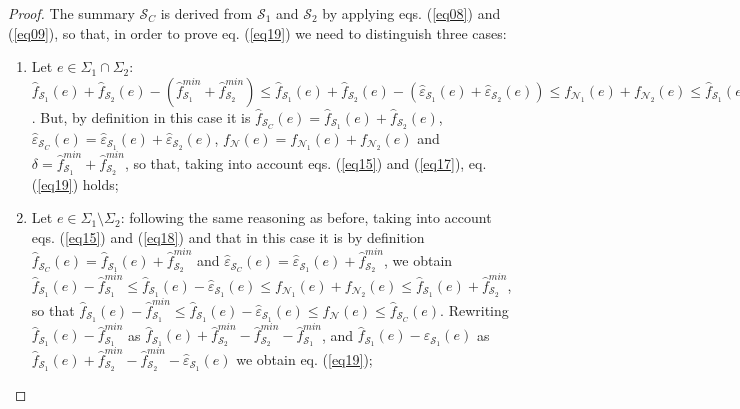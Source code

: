 \documentclass[final,3p,times]{elsarticle}
\begin{document}
\begin{proof}


The summary $\mathcal{S}_C$ is derived from $\mathcal{S}_1$ and $\mathcal{S}_2$ by applying eqs. (\ref{eq08}) and (\ref{eq09}), so that, in order to prove eq. (\ref{eq19}) we need to distinguish three cases:

\begin{enumerate}
  \item Let $e \in \Sigma_1 \cap \Sigma_2$: $\hat{f}_{\mathcal{S}_1}(e) + \hat{f}_{\mathcal{S}_2}(e) - (\hat{f}_{\mathcal{S}_1}^{min} + \hat{f}_{\mathcal{S}_2}^{min}) \leq \hat{f}_{\mathcal{S}_1}(e) + \hat{f}_{\mathcal{S}_2}(e) - (\hat{\varepsilon}_{\mathcal{S}_1}(e) + \hat{\varepsilon}_{\mathcal{S}_2}(e)) \leq f_{\mathcal{N}_1}(e) + f_{\mathcal{N}_2}(e) \leq \hat{f}_{\mathcal{S}_1}(e) + \hat{f}_{\mathcal{S}_2}(e)$. But, by definition in this case it is $\hat{f}_{\mathcal{S}_C}(e) = \hat{f}_{\mathcal{S}_1}(e) + \hat{f}_{\mathcal{S}_2}(e)$, $\hat{\varepsilon}_{\mathcal{S}_C}(e) = \hat{\varepsilon}_{\mathcal{S}_1}(e) + \hat{\varepsilon}_{\mathcal{S}_2}(e)$, 
       $f_{\mathcal{N}}(e) = f_{\mathcal{N}_1}(e) + f_{\mathcal{N}_2}(e)$ and $\delta = \hat{f}_{\mathcal{S}_1}^{min} + \hat{f}_{\mathcal{S}_2}^{min}$, so that, taking into account eqs. (\ref{eq15}) and (\ref{eq17}), eq. (\ref{eq19}) holds;
  
  \item Let $e \in \Sigma_1 \setminus \Sigma_2$: following the same reasoning as before, taking into account eqs. (\ref{eq15}) and (\ref{eq18}) and that in this case it is by definition $\hat{f}_{\mathcal{S}_C}(e) = \hat{f}_{\mathcal{S}_1}(e) + \hat{f}_{\mathcal{S}_2}^{min}$ and $\hat{\varepsilon}_{\mathcal{S}_C}(e) = \hat{\varepsilon}_{\mathcal{S}_1}(e) + \hat{f}_{\mathcal{S}_2}^{min}$, we obtain $\hat{f}_{\mathcal{S}_1}(e) - \hat{f}_{\mathcal{S}_1}^{min} \leq \hat{f}_{\mathcal{S}_1}(e) - \hat{\varepsilon}_{\mathcal{S}_1}(e) \leq f_{\mathcal{N}_1}(e) + f_{\mathcal{N}_2}(e) \leq \hat{f}_{\mathcal{S}_1}(e) + \hat{f}_{\mathcal{S}_2}^{min}$, so that $\hat{f}_{\mathcal{S}_1}(e) - \hat{f}_{\mathcal{S}_1}^{min} \leq \hat{f}_{\mathcal{S}_1}(e) - \hat{\varepsilon}_{\mathcal{S}_1}(e) \leq f_{\mathcal{N}}(e) \leq \hat{f}_{\mathcal{S}_C}(e)$. Rewriting $\hat{f}_{\mathcal{S}_1}(e) - \hat{f}_{\mathcal{S}_1}^{min}$ as $\hat{f}_{\mathcal{S}_1}(e) + \hat{f}_{\mathcal{S}_2}^{min} - \hat{f}_{\mathcal{S}_2}^{min} - \hat{f}_{\mathcal{S}_1}^{min}$, and $\hat{f}_{\mathcal{S}_1}(e) - \hat{\varepsilon}_{\mathcal{S}_1}(e)$ as $\hat{f}_{\mathcal{S}_1}(e) + \hat{f}_{\mathcal{S}_2}^{min} - \hat{f}_{\mathcal{S}_2}^{min} - \hat{\varepsilon}_{\mathcal{S}_1}(e)$ we obtain eq. (\ref{eq19});


\end{enumerate}
\end{proof}
\end{document}
